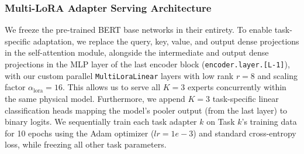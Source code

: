 \subsubsection{Multi-LoRA Adapter Serving Architecture}
We freeze the pre-trained BERT base networks in their entirety. To enable task-specific adaptation, we replace the query, key, value, and output dense projections in the self-attention module, alongside the intermediate and output dense projections in the MLP layer of the last encoder block (\texttt{encoder.layer.[L-1]}), with our custom parallel \texttt{MultiLoraLinear} layers with low rank $r=8$ and scaling factor $\alpha_{\text{lora}}=16$. This allows us to serve all $K=3$ experts concurrently within the same physical model. 
Furthermore, we append $K=3$ task-specific linear classification heads mapping the model's pooler output (from the last layer) to binary logits. We sequentially train each task adapter $k$ on Task $k$'s training data for 10 epochs using the Adam optimizer ($lr=1e-3$) and standard cross-entropy loss, while freezing all other task parameters.

